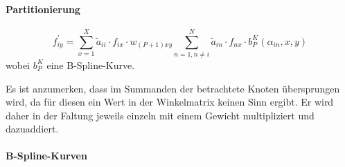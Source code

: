 \paragraph{Partitionierung}
\label{partitionierung}




\begin{equation}
  f^{\prime}_{iy} = \sum_{x = 1}^X \tilde a_{ii} \cdot f_{ix} \cdot w_{\left(P +1\right)xy} \sum_{n = 1, n \neq i}^N \tilde a_{in} \cdot f_{nx} \cdot b^K_P\left(\alpha_{in}, x, y\right)
\end{equation}
wobei $b_P^K$ eine B-Spline-Kurve.

Es ist anzumerken, dass im Summanden der betrachtete Knoten übersprungen wird, da für diesen ein Wert in der Winkelmatrix keinen Sinn ergibt.
Er wird daher in der Faltung jeweils einzeln mit einem Gewicht multipliziert und dazuaddiert.

\paragraph{B-Spline-Kurven}
\label{bspline}

